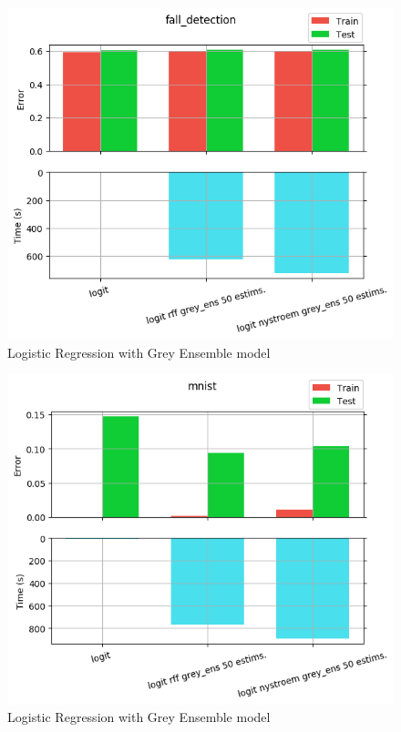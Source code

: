 \begin{figure}[th]
\centering
\includegraphics[scale=\imgscale]{Figures/2_4/fall_detection}
\decoRule
\caption[2.4 fall\tu detection]{Logistic Regression with Grey Ensemble model}
\label{fig:2_4_fall_detection}
\end{figure}

\begin{figure}[th]
\centering
\includegraphics[scale=\imgscale]{Figures/2_4/mnist}
\decoRule
\caption[2.4 mnist]{Logistic Regression with Grey Ensemble model}
\label{fig:2_4_mnist}
\end{figure}

